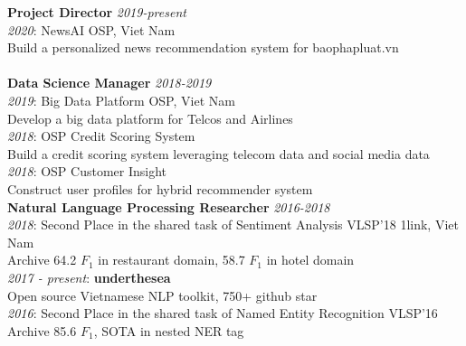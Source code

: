 \documentclass[11pt,a4paper,roman]{article}
\begin{document}
\textbf{Project Director}
\hfill
\textit{2019-present}
\\
\textit{2020}: NewsAI
\hfill
OSP, Viet Nam
\\
Build a personalized news recommendation system for baophapluat.vn
\\\\
\textbf{Data Science Manager}
\hfill
\textit{2018-2019}
\\
\textit{2019}: Big Data Platform
\hfill
OSP, Viet Nam
\\
Develop a big data platform for Telcos and Airlines
\\
\textit{2018}: OSP Credit Scoring System
\\
Build a credit scoring system leveraging telecom data and social media data
\\
\textit{2018}: OSP Customer Insight
\\
Construct user profiles for hybrid recommender system
\\


\noindent
\textbf{Natural Language Processing Researcher}
\hfill
\textit{2016-2018}
\\
\textit{2018}: Second Place in the shared task of Sentiment Analysis VLSP'18
\hfill
1link, Viet Nam
\\
Archive 64.2 $F_{1}$ in restaurant domain, 58.7 $F_{1}$ in hotel domain
\\
\textit{2017 - present}: \textbf{underthesea}
\\\noindent
Open source Vietnamese NLP toolkit, 750+ github star
\\
\textit{2016}: Second Place in the shared task of Named Entity Recognition VLSP'16
\\
Archive 85.6 $F_{1}$, SOTA in nested NER tag
\\
\end{document}

